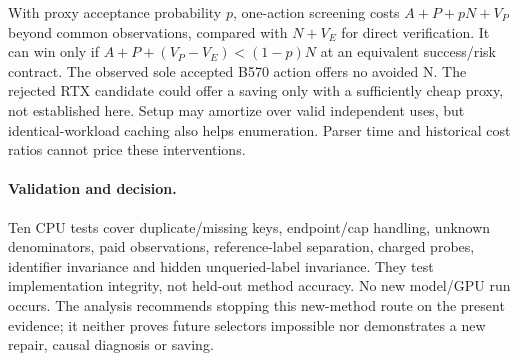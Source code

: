 With proxy acceptance probability $p$, one-action screening costs $A+P+pN+V_P$ beyond common observations, compared with $N+V_E$ for direct verification. It can win only if $A+P+(V_P-V_E)<(1-p)N$ at an equivalent success/risk contract. The observed sole accepted B570 action offers no avoided N. The rejected RTX candidate could offer a saving only with a sufficiently cheap proxy, not established here. Setup may amortize over valid independent uses, but identical-workload caching also helps enumeration. Parser time and historical cost ratios cannot price these interventions.

\paragraph{Validation and decision.}
Ten CPU tests cover duplicate/missing keys, endpoint/cap handling, unknown denominators, paid observations, reference-label separation, charged probes, identifier invariance and hidden unqueried-label invariance. They test implementation integrity, not held-out method accuracy. No new model/GPU run occurs. The analysis recommends stopping this new-method route on the present evidence; it neither proves future selectors impossible nor demonstrates a new repair, causal diagnosis or saving.


